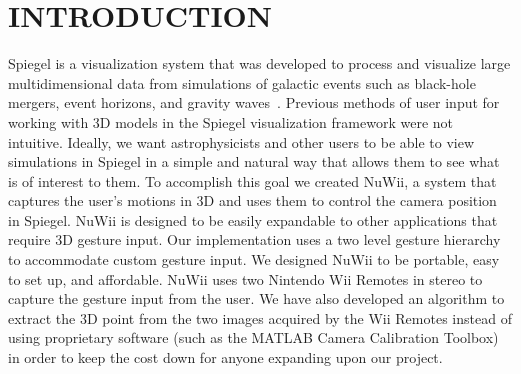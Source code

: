 \documentclass[a4paper,twoside]{article}
\begin{document}
 \onecolumn \maketitle \normalsize \vfill
 
\section{\uppercase{Introduction}} \label{sec:introduction} \noindent Spiegel
is a visualization system that was developed to process and visualize large
multidimensional data from simulations of galactic events such as black-hole
mergers, event horizons, and gravity waves~\cite{Bischof1:2010:Misc,Bischof06}.
Previous methods of user input for working with 3D models in the Spiegel
visualization framework were not intuitive. Ideally, we want astrophysicists
and other users to be able to view simulations in Spiegel in a simple and
natural way that allows them to see what is of interest to them. To accomplish
this goal we created NuWii, a system that captures the user's motions in 3D and
uses them to control the camera position in Spiegel. NuWii is designed to be
easily expandable to other applications that require 3D gesture input. Our
implementation uses a two level gesture hierarchy to accommodate custom gesture
input. We designed NuWii to be portable, easy to set up, and affordable. NuWii
uses two Nintendo Wii Remotes in stereo to capture the gesture input from the
user. We have also developed an algorithm to extract the 3D point from the two
images acquired by the Wii Remotes instead of using proprietary software (such
as the MATLAB Camera Calibration Toolbox) in order to keep the cost down for
anyone expanding upon our project. 
  
\end{document}
